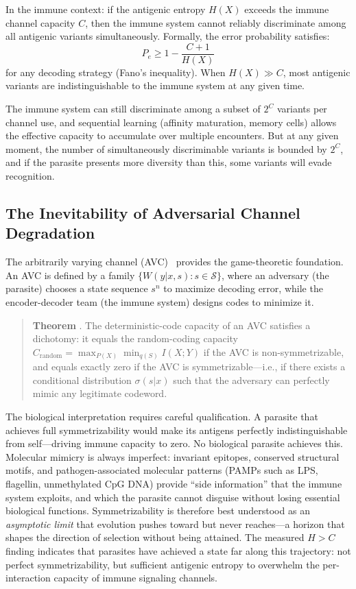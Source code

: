 \documentclass[twocolumn,10pt]{article}
\begin{document}
In the immune context: if the antigenic entropy $H(X)$ exceeds the immune channel capacity $C$, then the immune system cannot reliably discriminate among all antigenic variants simultaneously.  Formally, the error probability satisfies:
\begin{equation}
P_e \geq 1 - \frac{C + 1}{H(X)}
\label{eq:fano}
\end{equation}
for any decoding strategy (Fano's inequality).  When $H(X) \gg C$, most antigenic variants are indistinguishable to the immune system at any given time.

The immune system can still discriminate among a subset of $2^C$ variants per channel use, and sequential learning (affinity maturation, memory cells) allows the effective capacity to accumulate over multiple encounters.  But at any given moment, the number of simultaneously discriminable variants is bounded by $2^C$, and if the parasite presents more diversity than this, some variants will evade recognition.

\subsection{The Inevitability of Adversarial Channel Degradation}

The arbitrarily varying channel (AVC)~\citep{blackwell1960} provides the game-theoretic foundation.  An AVC is defined by a family $\{W(y|x,s) : s \in \mathcal{S}\}$, where an adversary (the parasite) chooses a state sequence $s^n$ to maximize decoding error, while the encoder-decoder team (the immune system) designs codes to minimize it.

\begin{quote}
\textbf{Theorem} \citep{csiszar1988}.  The deterministic-code capacity of an AVC satisfies a dichotomy: it equals the random-coding capacity $C_{\text{random}} = \max_{P(X)} \min_{q(S)} I(X;Y)$ if the AVC is non-symmetrizable, and equals exactly zero if the AVC is symmetrizable---i.e., if there exists a conditional distribution $\sigma(s|x)$ such that the adversary can perfectly mimic any legitimate codeword.
\end{quote}

The biological interpretation requires careful qualification.  A parasite that achieves full symmetrizability would make its antigens perfectly indistinguishable from self---driving immune capacity to zero.  No biological parasite achieves this.  Molecular mimicry is always imperfect: invariant epitopes, conserved structural motifs, and pathogen-associated molecular patterns (PAMPs such as LPS, flagellin, unmethylated CpG DNA) provide ``side information'' that the immune system exploits, and which the parasite cannot disguise without losing essential biological functions.  Symmetrizability is therefore best understood as an \emph{asymptotic limit} that evolution pushes toward but never reaches---a horizon that shapes the direction of selection without being attained.  The measured $H > C$ finding indicates that parasites have achieved a state far along this trajectory: not perfect symmetrizability, but sufficient antigenic entropy to overwhelm the per-interaction capacity of immune signaling channels.
\end{document}
